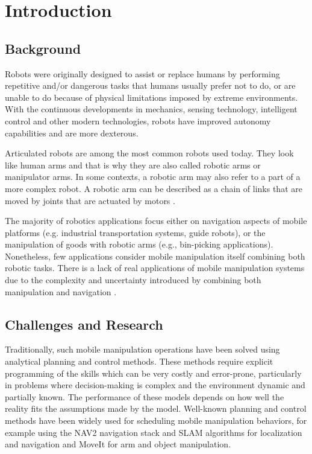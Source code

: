 \chapter*{Introduction}

\section*{Background}

Robots were originally designed to assist or replace humans by performing repetitive
and/or dangerous tasks that humans usually prefer not to do, or are unable to do
because of physical limitations imposed by extreme environments.
With the continuous developments in mechanics, sensing technology, intelligent control
and other modern technologies, robots have improved autonomy capabilities and are
more dexterous.

Articulated robots are among the most common robots used today. They look like human arms and
that is why they are also called robotic arms or manipulator arms. In some contexts,
a robotic arm may also refer to a part of a more complex robot. A robotic arm can be
described as a chain of links that are moved by joints that are actuated by motors \cite{liu2021deep}.

The majority of robotics applications focus either on navigation aspects of mobile platforms
(e.g. industrial transportation systems, guide robots), or the manipulation of goods
with robotic arms (e.g., bin-picking applications). Nonetheless, few applications consider mobile manipulation
itself combining both robotic tasks. There is a lack of real applications of mobile manipulation systems
due to the complexity and uncertainty introduced by combining both manipulation and navigation \cite{liu2021deep}.

\section*{Challenges and Research}

Traditionally, such mobile manipulation operations have been solved using analytical planning and control methods. 
These methods require explicit programming of the skills which can be very costly and error-prone, particularly
in problems where decision-making is complex and the environment dynamic and partially known.
The performance of these models depends on how well the reality fits the assumptions made by the model.
Well-known planning and control methods have been widely used for scheduling mobile manipulation behaviors, 
for example using the NAV2 navigation stack and SLAM algorithms for localization and navigation 
and MoveIt for arm and object manipulation.

